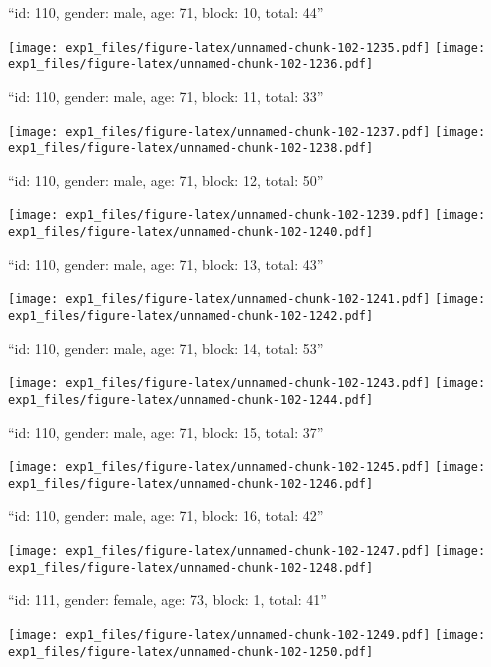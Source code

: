 \documentclass[11pt,,]{article}
\begin{document}
\newpage
[1] 

``id: 110, gender: male, age: 71, block: 10, total: 44''

\texttt{[image: exp1\_files/figure-latex/unnamed-chunk-102-1235.pdf]}
\texttt{[image: exp1\_files/figure-latex/unnamed-chunk-102-1236.pdf]}

\newpage
[1] 

``id: 110, gender: male, age: 71, block: 11, total: 33''

\texttt{[image: exp1\_files/figure-latex/unnamed-chunk-102-1237.pdf]}
\texttt{[image: exp1\_files/figure-latex/unnamed-chunk-102-1238.pdf]}

\newpage
[1] 

``id: 110, gender: male, age: 71, block: 12, total: 50''

\texttt{[image: exp1\_files/figure-latex/unnamed-chunk-102-1239.pdf]}
\texttt{[image: exp1\_files/figure-latex/unnamed-chunk-102-1240.pdf]}

\newpage
[1] 

``id: 110, gender: male, age: 71, block: 13, total: 43''

\texttt{[image: exp1\_files/figure-latex/unnamed-chunk-102-1241.pdf]}
\texttt{[image: exp1\_files/figure-latex/unnamed-chunk-102-1242.pdf]}

\newpage
[1] 

``id: 110, gender: male, age: 71, block: 14, total: 53''

\texttt{[image: exp1\_files/figure-latex/unnamed-chunk-102-1243.pdf]}
\texttt{[image: exp1\_files/figure-latex/unnamed-chunk-102-1244.pdf]}

\newpage
[1] 

``id: 110, gender: male, age: 71, block: 15, total: 37''

\texttt{[image: exp1\_files/figure-latex/unnamed-chunk-102-1245.pdf]}
\texttt{[image: exp1\_files/figure-latex/unnamed-chunk-102-1246.pdf]}

\newpage
[1] 

``id: 110, gender: male, age: 71, block: 16, total: 42''

\texttt{[image: exp1\_files/figure-latex/unnamed-chunk-102-1247.pdf]}
\texttt{[image: exp1\_files/figure-latex/unnamed-chunk-102-1248.pdf]}

\newpage
[1] 

``id: 111, gender: female, age: 73, block: 1, total: 41''

\texttt{[image: exp1\_files/figure-latex/unnamed-chunk-102-1249.pdf]}
\texttt{[image: exp1\_files/figure-latex/unnamed-chunk-102-1250.pdf]}
\end{document}
